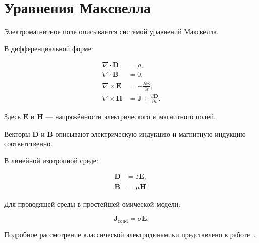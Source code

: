 \section{Уравнения Максвелла}
\label{sec:maxwell}

Электромагнитное поле описывается
системой уравнений Максвелла.

В дифференциальной форме:

\begin{align}
\nabla \cdot \mathbf{D} &= \rho,\\
\nabla \cdot \mathbf{B} &= 0,\\
\nabla \times \mathbf{E}
    &= -\frac{\partial \mathbf{B}}{\partial t},\\
\nabla \times \mathbf{H}
    &= \mathbf{J}
    + \frac{\partial \mathbf{D}}{\partial t}.
\end{align}

Здесь $\mathbf{E}$ и $\mathbf{H}$ ---
напряжённости электрического
и магнитного полей.

Векторы $\mathbf{D}$ и $\mathbf{B}$
описывают электрическую индукцию
и магнитную индукцию соответственно.

В линейной изотропной среде:

\begin{align}
\mathbf{D} &= \varepsilon \mathbf{E},\\
\mathbf{B} &= \mu \mathbf{H}.
\end{align}

Для проводящей среды в простейшей
омической модели:

\begin{equation}
\mathbf{J}_{\mathrm{cond}}
=
\sigma \mathbf{E}.
\end{equation}

Подробное рассмотрение классической
электродинамики представлено
в работе~\cite{jackson1999}.

